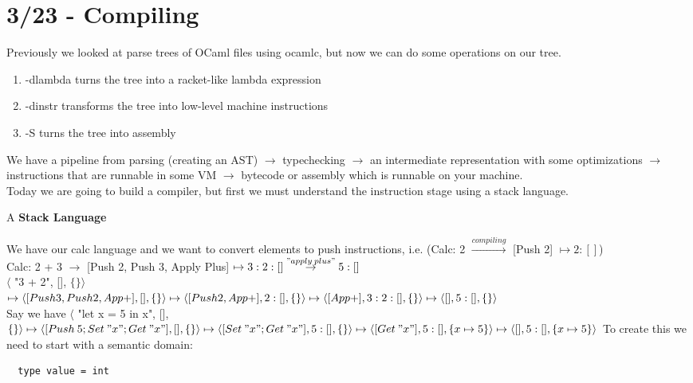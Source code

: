\section{3/23 - Compiling}
Previously we looked at parse trees of OCaml files using ocamlc, but now we can do some operations on our tree.
\begin{enumerate}
  \item -dlambda turns the tree into a racket-like lambda expression
  \item -dinstr transforms the tree into low-level machine instructions
  \item -S turns the tree into assembly
\end{enumerate}
We have a pipeline from parsing (creating an AST) $\to$ typechecking $\to$ an intermediate representation with some optimizations $\to$ instructions that are runnable in some VM $\to$ bytecode or assembly which is runnable on your machine.
\\
Today we are going to build a compiler, but first we must understand the instruction stage using a stack language.
\begin{definition}
  A \textbf{Stack Language} 
\end{definition}
We have our calc language and we want to convert elements to push instructions, i.e. (Calc: 2 $\overset{compiling}{\to}$ [Push 2] $\mapsto 2 : []$)
\\
Calc: 2 + 3 $\to$ [Push 2, Push 3, Apply Plus] $\mapsto 3 : 2 : [] \overset{"apply \: plus"}{\to} 5 : []$
\\
$\langle$ "3 + 2", [], $\{\} \rangle$
\\ 
$\mapsto \langle [Push 3, Push 2, App +], [], \{\} \rangle 
\\
\mapsto \langle [Push 2, App +], 2:[], \{\}\rangle
\\
\mapsto \langle [App +], 3:2:[], \{\}\rangle 
\\
\mapsto \langle [], 5:[],\{\}\rangle$
\\
Say we have $\langle$ "let x = 5 in x", [], $\{\} \rangle
\\
\mapsto \langle [Push \: 5; Set \:"x"; Get \: "x"], [], \{\}\rangle
\\
\mapsto \langle [Set \:"x"; Get \: "x"], 5:[], \{\}\rangle
\\
\mapsto \langle [Get \: "x"], 5:[], \{x \mapsto 5\}\rangle
\\
\mapsto \langle [], 5:[], \{x \mapsto 5\}\rangle
$
To create this we need to start with a semantic domain:
\begin{lstlisting}
  type value = int
\end{lstlisting}
